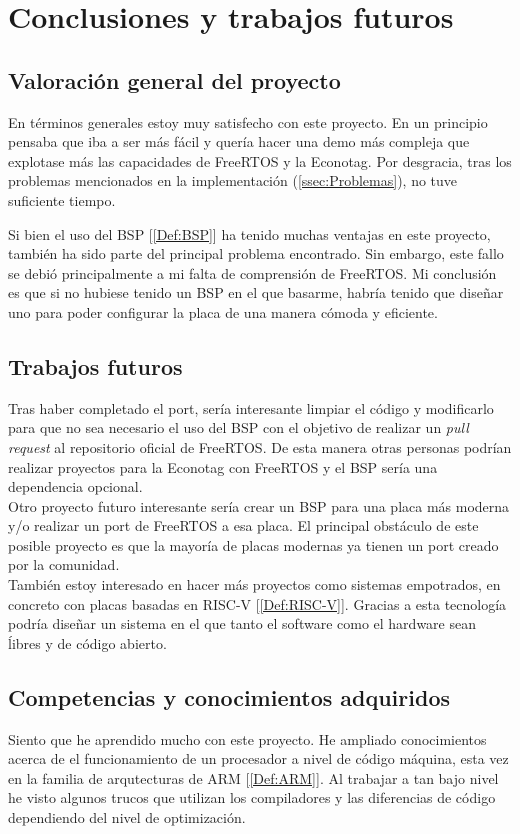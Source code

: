 \chapter{Conclusiones y trabajos futuros}
\section{Valoración general del proyecto}
En términos generales estoy muy satisfecho con este proyecto. En un principio pensaba que iba a ser más fácil y quería hacer una demo más compleja que explotase más las capacidades de FreeRTOS y la Econotag. Por desgracia, tras los problemas mencionados en la implementación (\autoref{ssec:Problemas}), no tuve suficiente tiempo.

Si bien el uso del BSP [\ref{Def:BSP}] ha tenido muchas ventajas en este proyecto, también ha sido parte del principal problema encontrado. Sin embargo, este fallo se debió principalmente a mi falta de comprensión de FreeRTOS. Mi conclusión es que si no hubiese tenido un BSP en el que basarme, habría tenido que diseñar uno para poder configurar la placa de una manera cómoda y eficiente.

\section{Trabajos futuros}
Tras haber completado el port, sería interesante limpiar el código y modificarlo para que no sea necesario el uso del BSP con el objetivo de realizar un \emph{pull request} al repositorio oficial de FreeRTOS. De esta manera otras personas podrían realizar proyectos para la Econotag con FreeRTOS y el BSP sería una dependencia opcional.\\

Otro proyecto futuro interesante sería crear un BSP para una placa más moderna y/o realizar un port de FreeRTOS a esa placa. El principal obstáculo de este posible proyecto es que la mayoría de placas modernas ya tienen un port creado por la comunidad.\\

También estoy interesado en hacer más proyectos como sistemas empotrados, en concreto con placas basadas en RISC-V [\ref{Def:RISC-V}]. Gracias a esta tecnología podría diseñar un sistema en el que tanto el software como el hardware sean ĺibres y de código abierto.


\section{Competencias y conocimientos adquiridos}
Siento que he aprendido mucho con este proyecto. He ampliado conocimientos acerca de el funcionamiento de un procesador a nivel de código máquina, esta vez en la familia de arqutecturas de ARM [\ref{Def:ARM}]. Al trabajar a tan bajo nivel he visto algunos trucos que utilizan los compiladores y las diferencias de código dependiendo del nivel de optimización.\\

